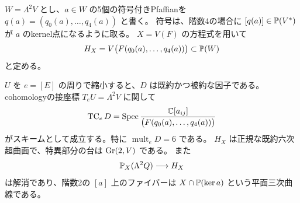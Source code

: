 $W=\Lambda^2V$ とし、$a\in W$ の5個の符号付きPfaffianを
$q(a)=(q_0(a),\ldots,q_4(a))$ と書く。
符号は、階数4の場合に $[q(a)]\in\mathbb P(V^*)$ が $a$ のkernel点になるように取る。
$X=V(F)$ の方程式を用いて
\[
 H_X=V\bigl(F(q_0(a),\ldots,q_4(a))\bigr)\subset\mathbb P(W)
\]
と定める。

\begin{theorem}[境界の重複度と接錐]\label{thm:sextic-boundary}
$U$ を $e=[E]$ の周りで縮小すると、$D$ は既約かつ被約な因子である。
cohomologyの接座標 $T_eU=\Lambda^2V$ に関して
\[
 \operatorname{TC}_eD
 =\operatorname{Spec}
 \frac{\mathbb C[a_{ij}]}{\bigl(F(q_0(a),\ldots,q_4(a))\bigr)}
\]
がスキームとして成立する。特に $\operatorname{mult}_eD=6$ である。
$H_X$ は正規な既約六次超曲面で、特異部分の台は $\operatorname{Gr}(2,V)$ である。
また
\[
 \mathbb P_X(\Lambda^2Q)\longrightarrow H_X
\]
は解消であり、階数2の $[a]$ 上のファイバーは
$X\cap\mathbb P(\ker a)$ という平面三次曲線である。
\end{theorem}

